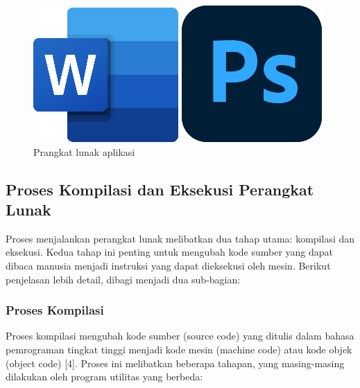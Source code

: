 \begin{figure}[!htb]
	\begin{minipage}{0.5\textwidth}
		\centering
		\includegraphics[width=0.3\linewidth]
		{assets/pics/word.png}
	\end{minipage}
	\begin{minipage}{0.5\textwidth}
		\includegraphics[width=0.3\linewidth]
		{assets/pics/photoshop.png}
	\end{minipage}
	\caption{Prangkat lunak aplikasi}
\end{figure}

\subsection{Proses Kompilasi dan Eksekusi Perangkat Lunak}
Proses menjalankan perangkat lunak melibatkan dua tahap utama: kompilasi dan eksekusi. Kedua tahap ini penting untuk mengubah kode sumber yang dapat dibaca manusia menjadi instruksi yang dapat dieksekusi oleh mesin. Berikut penjelasan lebih detail, dibagi menjadi dua sub-bagian:

\subsubsection{Proses Kompilasi}
Proses kompilasi mengubah kode sumber (source code) yang ditulis dalam bahasa pemrograman tingkat tinggi menjadi kode mesin (machine code) atau kode objek (object code) [4]. Proses ini melibatkan beberapa tahapan, yang masing-masing dilakukan oleh program utilitas yang berbeda:

